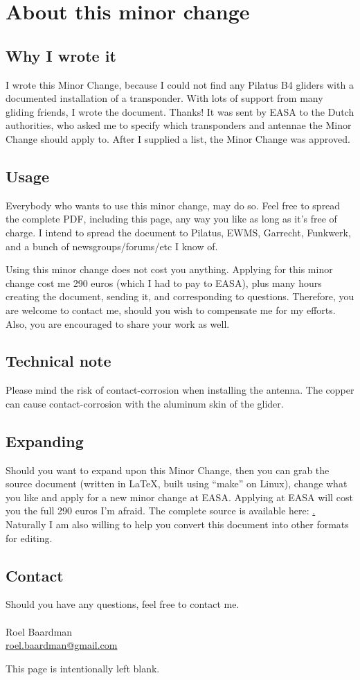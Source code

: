 \documentclass{article}
\begin{document}
\section{About this minor change}

\subsection{Why I wrote it}
I wrote this Minor Change, because I could not find any Pilatus B4 gliders with a documented installation of a transponder. With lots of support from many gliding friends, I wrote the document. Thanks! It was sent by EASA to the Dutch authorities, who asked me to specify which transponders and antennae the Minor Change should apply to. After I supplied a list, the Minor Change was approved.

\subsection{Usage}
Everybody who wants to use this minor change, may do so. Feel free to spread the complete PDF, including this page, any way you like as long as it’s free of charge. I intend to spread the document to Pilatus, EWMS, Garrecht, Funkwerk, and a bunch of newsgroups/forums/etc I know of. 

Using this minor change does not cost you anything. Applying for this minor change cost me 290 euros (which I had to pay to EASA), plus many hours creating the document, sending it, and corresponding to questions. 
Therefore, you are welcome to contact me, should you wish to compensate me for my efforts. Also, you are encouraged to share your work as well.

\subsection{Technical note}
Please mind the risk of contact-corrosion when installing the antenna. The copper can cause contact-corrosion with the aluminum skin of the glider. 

\subsection{Expanding}
Should you want to expand upon this Minor Change, then you can grab the source document (written in LaTeX, built using “make” on Linux), change what you like and apply for a new minor change at EASA. Applying at EASA will cost you the full 290 euros I’m afraid.
The complete source is available here: \href{https://github.com/roeles/minor_change_transponder}.
Naturally I am also willing to help you convert this document into other formats for editing.

\subsection{Contact}
Should you have any questions, feel free to contact me. \\
\\
Roel Baardman \\
\href{mailto:roel.baardman@gmail.com}{roel.baardman@gmail.com}

\newpage
This page is intentionally left blank.
\end{document}
